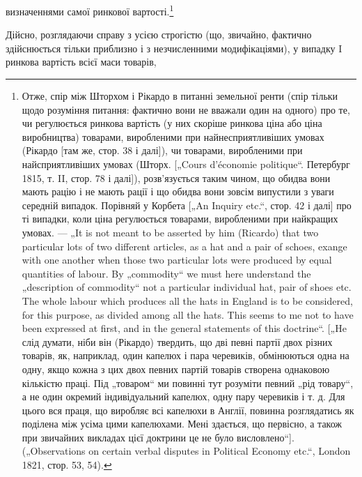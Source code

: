 визначеннями самої ринкової вартості.\footnote{
Отже, спір між Шторхом і Рікардо в питанні земельної ренти (спір
тільки щодо розуміння питання: фактично вони не вважали один на одного)
про те, чи регулюється ринкова вартість (у них скоріше ринкова ціна або
ціна виробництва) товарами, виробленими при найнесприятливіших умовах
(Рікардо [там же, стор. 38 і далі]), чи товарами, виробленими при найсприятливіших умовах (Шторх.
[„Cours d’économie politique“. Петербург 1815, т. II,
стор. 78 і далі]), розв’язується таким чином, що обидва вони мають рацію
і не мають рації і що обидва вони зовсім випустили з уваги середній випадок.
Порівняй у Корбета [„An Inquiry etc.“, стор. 42 і далі] про ті випадки, коли
ціна регулюється товарами, виробленими при найкращих умовах. — „It is not meant
to be asserted by him (Ricardo) that two particular lots of two different articles,
as a hat and a pair of schoes, exange with one another when those two particular
lots were produced by equal quantities of labour. By „commodity“ we must here
understand the „description of commodity“ not a particular individual hat, pair
of shoes etc. The whole labour which produces all the hats in England is to be
considered, for this purpose, as divided among all the hats. This seems to me not
to have been expressed at first, and in the general statements of this doctrine“. [„He
слід думати, ніби він (Рікардо) твердить, що дві певні партії двох різних товарів, як,
наприклад, один капелюх і пара черевиків, обмінюються одна на одну, якщо
кожна з цих двох певних партій товарів створена однаковою кількістю праці.
Під „товаром“ ми повинні тут розуміти певний „рід товару“, а не один окремий
індивідуальний капелюх, одну пару черевиків і т. д. Для цього вся праця, що виробляє всі капелюхи в
Англії, повинна розглядатись як поділена між усіма цими капелюхами. Мені здається, що первісно, а
також при звичайних викладах цієї
доктрини це не було висловлено“]. („Observations on certain verbal disputes in
Political Economy etc.“, London 1821, стор. 53, 54).
}

Дійсно, розглядаючи справу з усією строгістю (що, звичайно,
фактично здійснюється тільки приблизно і з незчисленними модифікаціями), у випадку I ринкова
вартість всієї маси товарів,